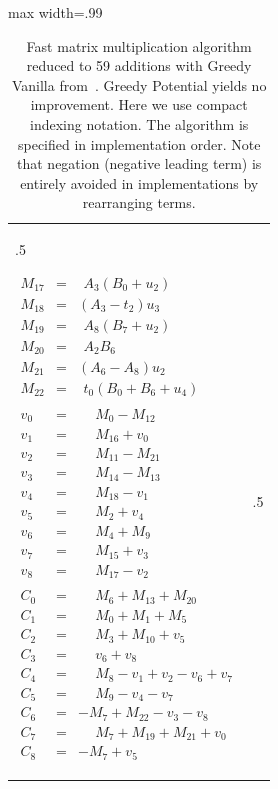 \documentclass{article}
\newcommand{\GV}{Greedy Vanilla}
\newcommand{\GP}{Greedy Potential}
\begin{document}
\begin{table}[ht!]
\begin{adjustbox}{max width=.99\textwidth}
\begin{tabularx}{\textwidth}{>{\hsize.5\hsize\raggedright\arraybackslash}X>{\hsize.5\hsize}X}
\begin{eqnarray*}
M_{17} &=& \phantom{(}A_{3}(B_{0}+u_{2})\\
M_{18} &=& (A_{3}-t_{2})u_{3}\\
M_{19} &=& \phantom{(}A_{8}(B_{7}+u_{2})\\
M_{20} &=& \phantom{(}A_{2}B_{6}\\
M_{21} &=& (A_{6}-A_{8})u_{2}\\
M_{22} &=& \phantom{(}t_{0}(B_{0}+B_{6}+u_{4})\\
~\\
v_{0} &=& \phantom{-}M_{0}-M_{12}\\
v_{1} &=& \phantom{-}M_{16}+v_{0}\\
v_{2} &=& \phantom{-}M_{11}-M_{21}\\
v_{3} &=& \phantom{-}M_{14}-M_{13}\\
v_{4} &=& \phantom{-}M_{18}-v_{1}\\
v_{5} &=& \phantom{-}M_{2}+v_{4}\\
v_{6} &=& \phantom{-}M_{4}+M_{9}\\
v_{7} &=& \phantom{-}M_{15}+v_{3}\\
v_{8} &=& \phantom{-}M_{17}-v_{2}\\
~\\
C_{0} &=& \phantom{-}M_{6}+M_{13}+M_{20}\\
C_{1} &=& \phantom{-}M_{0}+M_{1}+M_{5}\\
C_{2} &=& \phantom{-}M_{3}+M_{10}+v_{5}\\
C_{3} &=& \phantom{-}v_{6}+v_{8}\\
C_{4} &=& \phantom{-}M_{8}-v_{1}+v_{2}-v_{6}+v_{7}\\
C_{5} &=& \phantom{-}M_{9}-v_{4}-v_{7}\\
C_{6} &=& -M_{7}+M_{22}-v_{3}-v_{8}\\
C_{7} &=& \phantom{-}M_{7}+M_{19}+M_{21}+v_{0}\\
C_{8} &=& -M_{7}+v_{5}
\end{eqnarray*}
\end{tabularx}
\end{adjustbox}
    \caption{Fast matrix multiplication algorithm reduced to 59 additions with \GV{} from~\cite{MartenssonStankovski}. \GP{} yields no improvement. Here we use compact indexing notation. The algorithm is specified in implementation order. Note that negation (negative leading term) is entirely avoided in implementations by rearranging terms.}
    \label{tab:stapleton_59_after}
\end{table}

\clearpage
\end{document}
